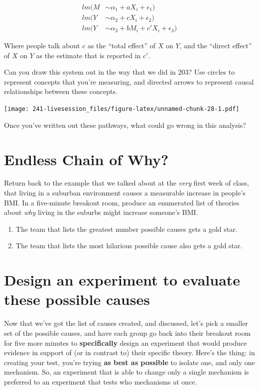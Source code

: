 \documentclass[
]{book}
\providecommand{\tightlist}{%
  \setlength{\itemsep}{0pt}\setlength{\parskip}{0pt}}
\begin{document}
\[
  \begin{aligned}
    lm(M &\sim \alpha_{1} + aX_{i} + \epsilon_{1}) \\ 
    lm(Y &\sim \alpha_{2} + cX_{i} + \epsilon_{2}) \\ 
    lm(Y &\sim \alpha_{3} + bM_{i} + c'X_{i} + \epsilon_{3})
  \end{aligned}
\]

Where people talk about \(c\) as the ``total effect'' of \(X\) on \(Y\),
and the ``direct effect'' of \(X\) on \(Y\) as the estimate that is
reported in \(c'\).

Can you draw this system out in the way that we did in 203? Use circles
to represent concepts that you're measuring, and directed arrows to
represent causal relationships between these concepts.

\texttt{[image: 241-livesession\_files/figure-latex/unnamed-chunk-28-1.pdf]}

Once you've written out these pathways, what could go wrong in this
analysis?

\hypertarget{endless-chain-of-why}{%
\section{Endless Chain of Why?}\label{endless-chain-of-why}}

Return back to the example that we talked about at the \emph{very} first
week of class, that living in a suburban environment causes a measurable
increase in people's BMI. In a five-minute breakout room, produce an
enumerated list of theories about \emph{why} living in the suburbs might
increase someone's BMI.

\begin{enumerate}
\def\labelenumi{\arabic{enumi}.}
\tightlist
\item
  The team that lists the greatest number possible causes gets a gold
  star.
\item
  The team that lists the most hilarious possible cause also gets a gold
  star.
\end{enumerate}

\hypertarget{design-an-experiment-to-evaluate-these-possible-causes}{%
\section{Design an experiment to evaluate these possible
causes}\label{design-an-experiment-to-evaluate-these-possible-causes}}

Now that we've got the list of causes created, and discussed, let's pick
a smaller set of the possible causes, and have each group go back into
their breakout room for five more minutes to \textbf{specifically}
design an experiment that would produce evidence in support of (or in
contrast to) their specific theory. Here's the thing: in creating your
test, you're trying \textbf{as best as possible} to isolate one, and
only one mechanism. So, an experiment that is able to change only a
single mechanism is preferred to an experiment that tests who mechanisms
at once.
\end{document}
